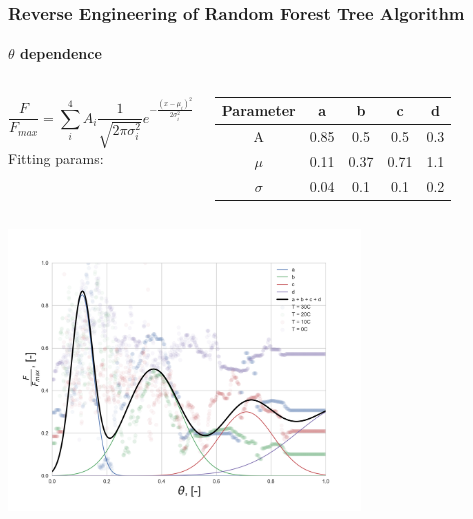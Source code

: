 \documentclass{beamer}
\begin{document}
\begin{frame}
\frametitle{Reverse Engineering of Random Forest Tree Algorithm}
\framesubtitle{$\theta$ dependence}

\begin{columns}[t]
\tiny
{}
\begin{equation}
    \frac{F}{F_{max}} = \sum\limits^{4}_i A_i\frac{1}{\sqrt{2\pi \sigma_i^2}} e^{- \frac{(x - \mu_i)^2}{2\sigma_i^2}}
\end{equation}
\tiny
\centering
Fitting params: \\
\begin{tabular}{|c|c|c|c|c|}
 \hline
 Parameter & a    & b    & c    & d\\ \hline
 A         & 0.85  & 0.5 & 0.5  & 0.3 \\ \hline
 $\mu$     & 0.11 & 0.37 & 0.71 & 1.1 \\ \hline
 $\sigma$  & 0.04 & 0.1 & 0.1  & 0.2 \\ \hline

\end{tabular}

\end{columns}


\centering
\includegraphics[width=0.7\textwidth]{Theta_dependence_fit.png}

\end{frame}
\end{document}
